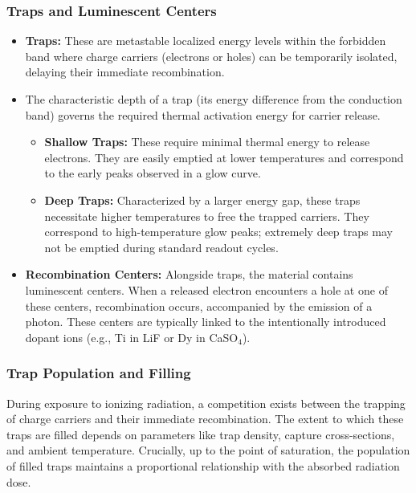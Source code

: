 \subsubsection{Traps and Luminescent Centers}
\begin{itemize}
    \item \textbf{Traps:} These are metastable localized energy levels within the forbidden band where charge carriers (electrons or holes) can be temporarily isolated, delaying their immediate recombination.
    \item The characteristic depth of a trap (its energy difference from the conduction band) governs the required thermal activation energy for carrier release.
    \begin{itemize}
        \item \textbf{Shallow Traps:} These require minimal thermal energy to release electrons. They are easily emptied at lower temperatures and correspond to the early peaks observed in a glow curve.
        \item \textbf{Deep Traps:} Characterized by a larger energy gap, these traps necessitate higher temperatures to free the trapped carriers. They correspond to high-temperature glow peaks; extremely deep traps may not be emptied during standard readout cycles.
    \end{itemize}
    \item \textbf{Recombination Centers:} Alongside traps, the material contains luminescent centers. When a released electron encounters a hole at one of these centers, recombination occurs, accompanied by the emission of a photon. These centers are typically linked to the intentionally introduced dopant ions (e.g., Ti in LiF or Dy in CaSO$_4$).
\end{itemize}

\subsubsection{Trap Population and Filling}
During exposure to ionizing radiation, a competition exists between the trapping of charge carriers and their immediate recombination. The extent to which these traps are filled depends on parameters like trap density, capture cross-sections, and ambient temperature. Crucially, up to the point of saturation, the population of filled traps maintains a proportional relationship with the absorbed radiation dose.

